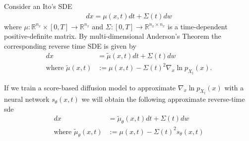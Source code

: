 Consider an Ito's SDE
\begin{align*}
    dx = \mu(x, t)dt + \Sigma(t)dw
\end{align*}
where $\mu: \mathbb{R}^{n_x} \times [0,T] \xrightarrow{} \mathbb{R}^{n_x}$ and $\Sigma: [0,T] \xrightarrow{} \mathbb{R}^{n_x \times n_x}$ is a time-dependent positive-definite matrix. By multi-dimensional Anderson's Theorem \cite{anderson1982reverse_time_sde} the corresponding reverse time SDE is given by 
\begin{align}
    \label{eq:true_rtsde}
    dx &= \tilde{\mu}(x, t)dt + \Sigma(t)dw \\
    \text{where } \tilde{\mu}(x,t) &:= \mu(x,t) -  \Sigma(t)^2 \nabla_x \ln p_{X_t}(x). \nonumber
\end{align}

If we train a score-based diffusion model to approximate $\nabla_x \ln p_{X_t}(x)$ with a neural network $s_\theta(x,t)$ we will obtain the following approximate reverse-time sde
\begin{align}
    \label{eq:approx_rtsde}
    dx &= \tilde{\mu}_\theta(x, t)dt + \Sigma(t)dw \\
    \text{where } \tilde{\mu}_\theta(x,t) &:= \mu(x,t) -  \Sigma(t)^2 s_\theta(x,t) \nonumber
\end{align} 


